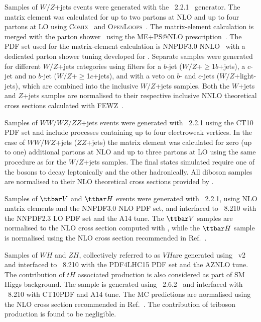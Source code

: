 \documentclass[PAPER, coverpage, atlasdraft=true, texlive=2016, UKenglish]{\ATLASLATEXPATH atlasdoc}
\providecommand{\DIFadd}[1]{{\protect\color{blue}\uwave{#1}}} %
\providecommand{\DIFaddbegin}{} %
\providecommand{\DIFaddend}{} %
\begin{document}
Samples of $W/Z$+jets events were generated with the {\sherpa}~2.2.1~\cite{Gleisberg:2008ta} generator. 
The matrix element was calculated for up to two partons at NLO and up to four partons at LO using 
\textsc{Comix}~\cite{Gleisberg:2008fv} and \textsc{OpenLoops}~\cite{Cascioli:2011va}. The matrix-element calculation 
is merged with the {\sherpa} parton shower~\cite{Schumann:2007mg} using the ME+PS@NLO prescription~\cite{Hoeche:2012yf}. 
The PDF set used for the matrix-element calculation is NNPDF3.0 NNLO~\cite{Ball:2014uwa} with a dedicated parton shower tuning developed for {\sherpa}. 
Separate samples were generated for different $W/Z$+jets categories using filters for a $b$-jet 
($W/Z$+$\geq$1$b$+jets), a $c$-jet and no $b$-jet ($W/Z$+$\geq$1$c$+jets), and with a veto on $b$- and $c$-jets 
($W/Z$+light-jets), which are combined into the inclusive $W/Z$+jets samples.
Both the $W$+jets and $Z$+jets samples are normalised to their respective inclusive NNLO theoretical 
cross sections calculated with \textsc{FEWZ}~\cite{Anastasiou:2003ds}.

Samples of $WW/WZ/ZZ$+jets events were generated with {\sherpa}~2.2.1 using the CT10 PDF set
and include processes containing up to four electroweak vertices. 
In the case of $WW/WZ$+jets ($ZZ$+jets) the matrix element was calculated for zero (up to one) additional partons 
at NLO and up to three partons at LO using the same procedure as for the $W/Z$+jets samples. 
The final states \DIFaddbegin \DIFadd{that were }\DIFaddend simulated require one of the bosons to decay leptonically and the other hadronically.
All diboson samples are normalised to their NLO theoretical cross sections provided by {\sherpa}. 

Samples of $\ttbar V$ \DIFaddbegin \DIFadd{($V=W\, Z$ boson) }\DIFaddend and $\ttbar H$ events were generated with {\amcatnlo}~2.2.1, using NLO matrix elements and the NNPDF3.0 NLO PDF set,
and interfaced to {\pythia}~8.210 with the NNPDF2.3 LO PDF set and the A14 tune. 
The $\ttbar V$ samples are normalised to the NLO cross section computed with {\amcatnlo}, while the $\ttbar H$ sample is normalised using 
the NLO cross section recommended in Ref.~\cite{deFlorian:2016spz}.

Samples of $WH$ and $ZH$, collectively referred to as $VH$\DIFaddbegin \DIFadd{, }\DIFaddend are generated using {\powheg}~v2\cite{Frixione:2007nw,Nason:2004rx,Frixione:2007vw,Alioli:2010xd}
and interfaced to {\pythia}~8.210 with the PDF4LHC15 PDF set and the AZNLO tune.
The contribution of $tH$ associated production is also considered as part of \DIFaddbegin \DIFadd{the }\DIFaddend SM Higgs background.
The sample is generated using {\amcatnlolong}~2.6.2~\cite{Alwall:2014hca} and interfaced with {\pythia}~8.210 with CT10PDF
and \DIFaddbegin \DIFadd{the }\DIFaddend A14 tune. The MC predictions are normalised using the NLO cross section recommended in Ref.~\cite{deFlorian:2016spz}.
The contribution of triboson production is found to be negligible.
\end{document}
